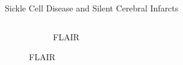 \documentclass[]{standalone}
\begin{document}
\begin{frame}{Sickle Cell Disease and Silent Cerebral Infarcts}{}
\begin{columns}
\begin{column}{0.8\textwidth}
\begin{figure}[h!]
\begin{subfigure}[b]{0.4\textwidth}
					\caption*{FLAIR}
				\end{subfigure}
				\hfill
			\end{figure}
		\end{column}
	\end{columns}
	\end{frame}
\end{document}
